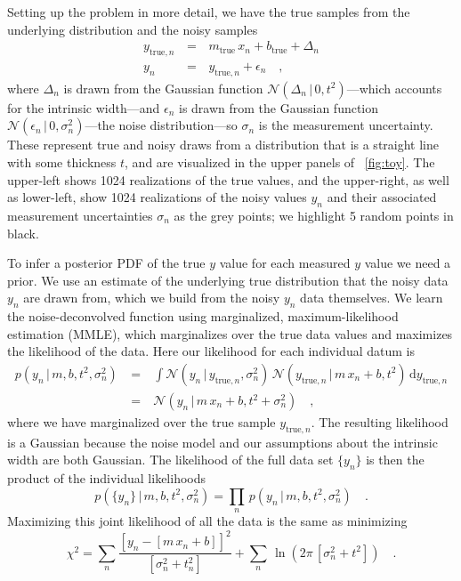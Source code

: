 \documentclass[modern]{aastex61}
\newcommand{\given}{\,|\,}
\newcommand{\dd}{\mathrm{d}}
\newcommand{\true}{\mathrm{true}}
\begin{document}
Setting up the problem in more detail, we have the true samples from the underlying distribution and the noisy samples
\begin{eqnarray}
y_{\true, n} \, &=& \, m_{\true}\,x_n + b_{\true} + \Delta_n \\
y_n \, &=& \, y_{\true,n} + \epsilon_n \quad,
\label{eq:ytrue}
\end{eqnarray}
where $\Delta_n$ is drawn from the Gaussian function $\mathcal{N}(\Delta_n \given 0, t^2)$---which accounts for the intrinsic width---and $\epsilon_n$ is drawn from the Gaussian function $\mathcal{N}(\epsilon_n \given 0, \sigma_n^2)$---the noise distribution---so $\sigma_n$ is the measurement uncertainty.
These represent true and noisy draws from a distribution that is a straight line with some thickness $t$, and are visualized in the upper panels of \figurename~\ref{fig:toy}.
The upper-left shows 1024 realizations of the true values, and the upper-right, as well as lower-left, show 1024 realizations of the noisy values $y_n$ and their associated measurement uncertainties $\sigma_n$ as the grey points; we highlight 5 random points in black.

To infer a posterior PDF of the true $y$ value for each measured $y$ value we need a prior. We use an estimate of the underlying true distribution that the noisy data $y_n$ are drawn from, which we build from the noisy $y_n$ data themselves.
We learn the noise-deconvolved function using marginalized, maximum-likelihood estimation (MMLE), which marginalizes over the true data values and maximizes the likelihood of the data. Here our likelihood for each individual datum is
\begin{eqnarray}
p(y_n \given m, b, t^2, \sigma_n^2) \ &=& \ \int \mathcal{N}(y_n \given y_{\true,n}, \sigma_n^2) \, \mathcal{N}(y_{\true,n} \given m\,x_n + b, t^2 ) \, \dd y_{\true, n} \\
&=&  \ \mathcal{N}(y_n \given m\,x_n + b, t^2 + \sigma_n^2) \quad,
\label{eq:toyLike}
\end{eqnarray}
where we have marginalized over the true sample $y_{\true, n}$. The resulting likelihood is a Gaussian because the noise model and our assumptions about the intrinsic width are both Gaussian. The likelihood of the full data set $\{y_n\}$ is then the product of the individual likelihoods
\begin{equation}
p(\{y_n\} \given m, b, t^2, \sigma_n^2) = \prod_n\, p(y_n \given m, b, t^2, \sigma_n^2) \quad .
\label{eq:toyLikeFull}
\end{equation}
Maximizing this joint likelihood of all the data is the same as minimizing
\begin{equation}
\chi^2 = \sum_n \frac{[y_n - [m\,x_n + b]]^2}{[\sigma_n^2 + t_n^2]} + \sum_n\,\ln(2\pi\,[\sigma_n^2 + t^2])
\quad .
\label{eq:chisq}
\end{equation}
\end{document}
